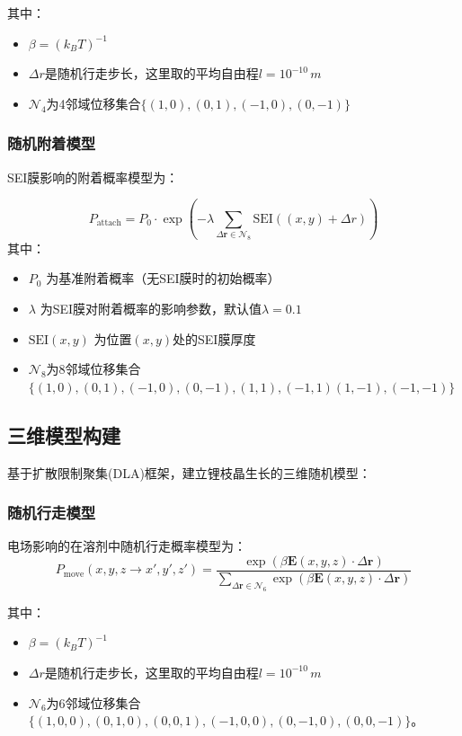 \documentclass{article}
\begin{document}
其中：
\begin{itemize}
\item $\beta=(k_B T)^{-1}$ 
\item $\Delta r$是随机行走步长，这里取的平均自由程$l=10^{-10}\,\si{m}$ 
\item $\mathcal{N}_4$为4邻域位移集合$\{(1,0),(0,1),(-1,0),(0,-1)\}$
\end{itemize}
\subsubsection{随机附着模型}
SEI膜影响的附着概率模型为：

\begin{equation}
P_{\text{attach}} = P_0 \cdot \exp\left(-\lambda \sum\limits_{\Delta\mathbf{r}\in \mathcal{N}_8} \text{SEI}\left((x,y)+\Delta r\right)\right)
\end{equation}
其中：
\begin{itemize}
\item $P_0$ 为基准附着概率（无SEI膜时的初始概率）
\item $\lambda$ 为SEI膜对附着概率的影响参数，默认值$\lambda=0.1$
\item $\text{SEI}(x,y)$ 为位置$(x,y)$处的SEI膜厚度
\item $\mathcal{N}_8$为8邻域位移集合$\{(1,0),(0,1),(-1,0),(0,-1),(1,1),(-1,1)(1,-1),(-1,-1)\}$
\end{itemize}

\subsection{三维模型构建}
基于扩散限制聚集(DLA)框架，建立锂枝晶生长的三维随机模型：
\subsubsection{随机行走模型}
电场影响的在溶剂中随机行走概率模型为：
\begin{equation}
P_{\text{move}}(x,y,z \to x',y',z') = \frac{\exp\left(\beta \mathbf{E}(x,y,z) \cdot \Delta\mathbf{r}\right)}{\sum\limits_{\Delta\mathbf{r}\in \mathcal{N}_6}\exp\left(\beta \mathbf{E}(x,y,z) \cdot \Delta\mathbf{r}\right)}
\end{equation}

其中：
\begin{itemize}
\item $\beta=(k_B T)^{-1}$ 
\item $\Delta r$是随机行走步长，这里取的平均自由程$l=10^{-10}\,\si{m}$ 
\item $\mathcal{N}_6$为6邻域位移集合$\{(1,0,0),(0,1,0),(0,0,1),(-1,0,0),(0,-1,0),(0,0,-1)\}$。
\end{itemize}
\end{document}
